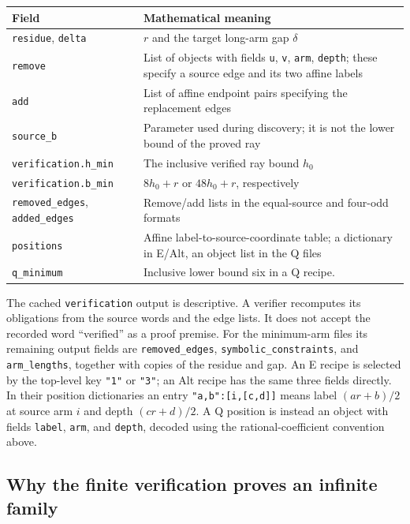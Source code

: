 \begin{center}
\begin{tabular}{p{}p{}}
Field & Mathematical meaning\\\hline
\texttt{residue}, \texttt{delta} & $r$ and the target long-arm gap $\delta$\\
\texttt{remove} & List of objects with fields \texttt{u}, \texttt{v},
\texttt{arm}, \texttt{depth}; these specify a source edge and its two affine labels\\
\texttt{add} & List of affine endpoint pairs specifying the replacement edges\\
\texttt{source\_b} & Parameter used during discovery; it is not the lower bound of the proved ray\\
\texttt{verification.h\_min} & The inclusive verified ray bound $h_0$\\
\texttt{verification.b\_min} & $8h_0+r$ or $48h_0+r$, respectively\\
\texttt{removed\_edges}, \texttt{added\_edges} & Remove/add lists in the equal-source and four-odd formats\\
\texttt{positions} & Affine label-to-source-coordinate table; a dictionary in E/Alt, an object list in the Q files\\
\texttt{q\_minimum} & Inclusive lower bound six in a Q recipe.
\end{tabular}
\end{center}
The cached \texttt{verification} output is descriptive.  A verifier
recomputes its obligations from the source words and the edge lists.
It does not accept the recorded word ``verified'' as a proof premise.
For the minimum-arm files its remaining output fields are
\texttt{removed\_edges}, \texttt{symbolic\_constraints}, and
\texttt{arm\_lengths}, together with copies of the residue and gap.
An E recipe is selected by the top-level key \texttt{"1"} or
\texttt{"3"}; an Alt recipe has the same three fields directly.
In their position dictionaries an entry
\texttt{"a,b":[i,[c,d]]} means label $(ar+b)/2$ at source arm $i$
and depth $(cr+d)/2$.  A Q position is instead an object with fields
\texttt{label}, \texttt{arm}, and \texttt{depth}, decoded using the
rational-coefficient convention above.

\subsection{Why the finite verification proves an infinite family}
\label{templates:soundness-section}

